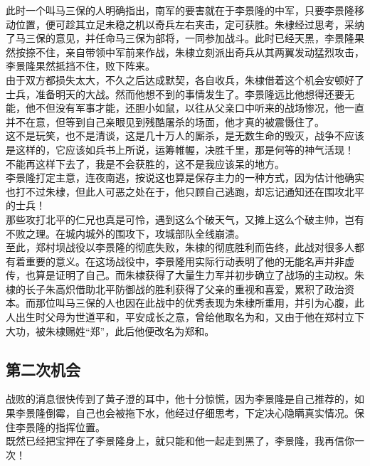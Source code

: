 \begin{multicols}{\theparacolNo}
此时一个叫马三保的人明确指出，南军的要害就在于李景隆的中军，只要李景隆移动位置，便可趁其立足未稳之机以奇兵左右夹击，定可获胜。朱棣经过思考，采纳了马三保的意见，并任命马三保为部将，一同参加战斗。此时已经天黑，李景隆果然按捺不住，亲自带领中军前来作战，朱棣立刻派出奇兵从其两翼发动猛烈攻击，李景隆果然抵挡不住，败下阵来。\\

由于双方都损失太大，不久之后达成默契，各自收兵，朱棣借着这个机会安顿好了士兵，准备明天的大战。然而他想不到的事情发生了。李景隆远比他想得还要无能，他不但没有军事才能，还胆小如鼠，以往从父亲口中听来的战场惨况，他一直并不在意，但等到自己亲眼见到残酷屠杀的场面，他才真的被震慑住了。\\

这不是玩笑，也不是清谈，这是几十万人的厮杀，是无数生命的毁灭，战争不应该是这样的，它应该如兵书上所说，运筹帷幄，决胜千里，那是何等的神气活现！\\

不能再这样下去了，我是不会获胜的，这不是我应该呆的地方。\\

李景隆打定主意，连夜南逃，按说这也算是保存主力的一种方式，因为估计他确实也打不过朱棣，但此人可恶之处在于，他只顾自己逃跑，却忘记通知还在围攻北平的士兵！\\

那些攻打北平的仁兄也真是可怜，遇到这么个破天气，又摊上这么个破主帅，岂有不败之理。在城内城外的围攻下，攻城部队全线崩溃。\\

至此，郑村坝战役以李景隆的彻底失败，朱棣的彻底胜利而告终，此战对很多人都有着重要的意义。在这场战役中，李景隆用实际行动表明了他的无能名声并非虚传，也算是证明了自己。而朱棣获得了大量生力军并初步确立了战场的主动权。朱棣的长子朱高炽借助北平防御战的胜利获得了父亲的重视和喜爱，累积了政治资本。而那位叫马三保的人也因在此战中的优秀表现为朱棣所重用，并引为心腹，此人出生时父母为世道平和，平安成长之意，曾给他取名为和，又由于他在郑村立下大功，被朱棣赐姓“郑”，此后他便改名为郑和。\\

\subsection{第二次机会}
战败的消息很快传到了黄子澄的耳中，他十分惊慌，因为李景隆是自己推荐的，如果李景隆倒霉，自己也会被拖下水，他经过仔细思考，下定决心隐瞒真实情况。保住李景隆的指挥位置。\\

既然已经把宝押在了李景隆身上，就只能和他一起走到黑了，李景隆，我再信你一次！\\


\end{multicols}
